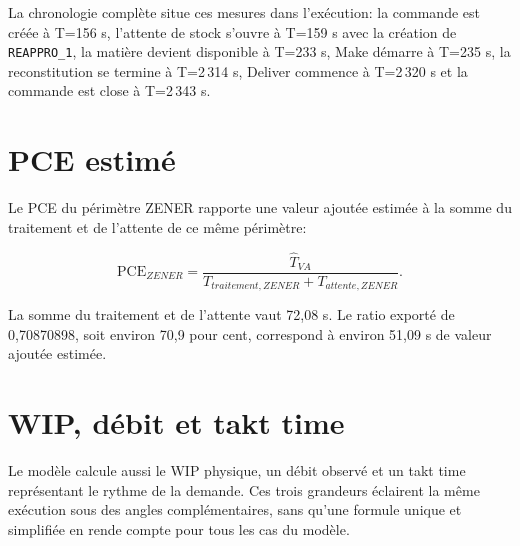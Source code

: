
La chronologie complète situe ces mesures dans l'exécution: la commande est créée à T=156 s, l'attente de stock s'ouvre à T=159 s avec la création de \texttt{REAPPRO\_1}, la matière devient disponible à T=233 s, Make démarre à T=235 s, la reconstitution se termine à T=2\,314 s, Deliver commence à T=2\,320 s et la commande est close à T=2\,343 s.

\section{PCE estimé}

Le PCE du périmètre ZENER rapporte une valeur ajoutée estimée à la somme du traitement et de l'attente de ce même périmètre:

\begin{equation}
\mathrm{PCE}_{ZENER}=\frac{\widehat{T}_{VA}}{T_{traitement,ZENER}+T_{attente,ZENER}}.
\label{eq:pce-zener-doc}
\end{equation}


La somme du traitement et de l'attente vaut 72,08 s. Le ratio exporté de 0,70870898, soit environ 70,9 pour cent, correspond à environ 51,09 s de valeur ajoutée estimée.


\section{WIP, débit et takt time}

Le modèle calcule aussi le WIP physique, un débit observé et un takt time représentant le rythme de la demande. Ces trois grandeurs éclairent la même exécution sous des angles complémentaires, sans qu'une formule unique et simplifiée en rende compte pour tous les cas du modèle.

